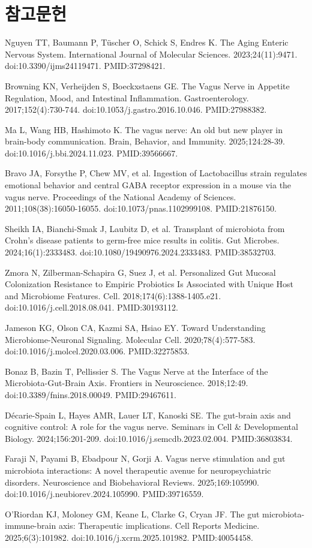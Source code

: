 \documentclass[11pt,oneside]{book}
\newcommand{\refstart}{\par\begingroup\footnotesize\setlength{\parskip}{2.5pt}\raggedright}
\newcommand{\reff}[2]{\par\hangindent=7mm\hangafter=1\noindent[#1]\hspace{2mm}#2\par}
\begin{document}
\section*{참고문헌}
\refstart
\reff{1}{Nguyen TT, Baumann P, Tüscher O, Schick S, Endres K. The Aging Enteric Nervous System. International Journal of Molecular Sciences. 2023;24(11):9471. doi:10.3390/ijms24119471. PMID:37298421.}
\reff{2}{Browning KN, Verheijden S, Boeckxstaens GE. The Vagus Nerve in Appetite Regulation, Mood, and Intestinal Inflammation. Gastroenterology. 2017;152(4):730-744. doi:10.1053/j.gastro.2016.10.046. PMID:27988382.}
\reff{3}{Ma L, Wang HB, Hashimoto K. The vagus nerve: An old but new player in brain-body communication. Brain, Behavior, and Immunity. 2025;124:28-39. doi:10.1016/j.bbi.2024.11.023. PMID:39566667.}
\reff{4}{Bravo JA, Forsythe P, Chew MV, et al. Ingestion of Lactobacillus strain regulates emotional behavior and central GABA receptor expression in a mouse via the vagus nerve. Proceedings of the National Academy of Sciences. 2011;108(38):16050-16055. doi:10.1073/pnas.1102999108. PMID:21876150.}
\reff{5}{Sheikh IA, Bianchi-Smak J, Laubitz D, et al. Transplant of microbiota from Crohn's disease patients to germ-free mice results in colitis. Gut Microbes. 2024;16(1):2333483. doi:10.1080/19490976.2024.2333483. PMID:38532703.}
\reff{6}{Zmora N, Zilberman-Schapira G, Suez J, et al. Personalized Gut Mucosal Colonization Resistance to Empiric Probiotics Is Associated with Unique Host and Microbiome Features. Cell. 2018;174(6):1388-1405.e21. doi:10.1016/j.cell.2018.08.041. PMID:30193112.}
\reff{7}{Jameson KG, Olson CA, Kazmi SA, Hsiao EY. Toward Understanding Microbiome-Neuronal Signaling. Molecular Cell. 2020;78(4):577-583. doi:10.1016/j.molcel.2020.03.006. PMID:32275853.}
\reff{8}{Bonaz B, Bazin T, Pellissier S. The Vagus Nerve at the Interface of the Microbiota-Gut-Brain Axis. Frontiers in Neuroscience. 2018;12:49. doi:10.3389/fnins.2018.00049. PMID:29467611.}
\reff{9}{Décarie-Spain L, Hayes AMR, Lauer LT, Kanoski SE. The gut-brain axis and cognitive control: A role for the vagus nerve. Seminars in Cell \& Developmental Biology. 2024;156:201-209. doi:10.1016/j.semcdb.2023.02.004. PMID:36803834.}
\reff{10}{Faraji N, Payami B, Ebadpour N, Gorji A. Vagus nerve stimulation and gut microbiota interactions: A novel therapeutic avenue for neuropsychiatric disorders. Neuroscience and Biobehavioral Reviews. 2025;169:105990. doi:10.1016/j.neubiorev.2024.105990. PMID:39716559.}
\reff{11}{O'Riordan KJ, Moloney GM, Keane L, Clarke G, Cryan JF. The gut microbiota-immune-brain axis: Therapeutic implications. Cell Reports Medicine. 2025;6(3):101982. doi:10.1016/j.xcrm.2025.101982. PMID:40054458.}
\end{document}
